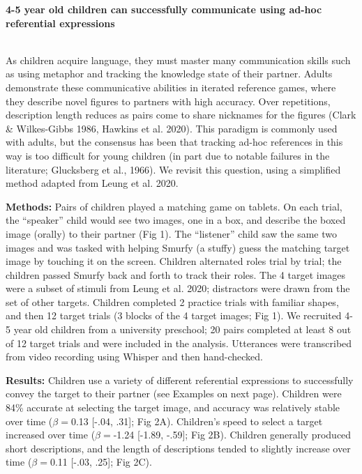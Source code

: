 \documentclass[11pt,a4paper]{article}
\renewcommand{\title}[1]{\textbf{#1}\\}
\newcommand{\authors}[1]{\iftoggle{anonymous}{\phantom{#1}}{#1}\\}
\newcommand{\email}[1]{\iftoggle{anonymous}{\phantom{#1}}{#1}}
\begin{document}

\noindent\title{4-5 year old children can successfully communicate using ad-hoc referential expressions}
\authors{Veronica Boyce, Ilaria Chen, Bobby Sparks, Malia Perez, Michael C. Frank} 
\email{vboyce@stanford.edu;  Stanford University}
\newline
%




As children acquire language, they must master many communication skills such as using metaphor and tracking the knowledge state of their partner. Adults demonstrate these communicative abilities in iterated reference games, where they describe novel figures to partners with high accuracy. Over repetitions, description length reduces as pairs come to share nicknames for the figures (Clark \& Wilkes-Gibbs 1986, Hawkins et al. 2020). This paradigm is commonly used with adults, but the consensus has been that tracking ad-hoc references in this way is too difficult for young children (in part due to notable failures in the literature; Glucksberg et al., 1966). We revisit this question, using a simplified method adapted from Leung et al. 2020.

\bigskip
\textbf{Methods:} Pairs of children played a matching game on tablets. On each trial, the ``speaker'' child would see two images, one in a box, and describe the boxed image (orally) to their partner (Fig 1). The ``listener'' child saw the same two images and was tasked with helping Smurfy (a stuffy) guess the matching target image by touching it on the screen. Children alternated roles trial by trial; the children passed Smurfy back and forth to track their roles. The 4 target images were a subset of stimuli from Leung et al. 2020; distractors were drawn from the set of other targets. Children completed 2 practice trials with familiar shapes, and then 12 target trials (3 blocks of the 4 target images; Fig 1). We recruited 4-5 year old children from a university preschool; 20 pairs completed at least 8 out of 12 target trials and were included in the analysis. Utterances were transcribed from video recording using Whisper and then hand-checked. 

\bigskip

\textbf{Results:} 
Children use a variety of different referential expressions to successfully convey the target to their partner (see Examples on next page). Children were 84\% accurate at selecting the target image, and accuracy was relatively stable over time ($\beta=$0.13 [-.04, .31]; Fig 2A). Children's speed to select a target increased over time ($\beta=$-1.24 [-1.89, -.59]; Fig 2B). Children generally produced short descriptions, and the length of descriptions tended to slightly increase over time ($\beta=$0.11 [-.03, .25]; Fig 2C). 
\end{document}
